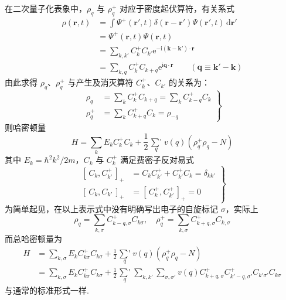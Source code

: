 在二次量子化表象中，$\rho_{q}$ 与 $\rho_{q}^{+}$ 对应于密度起伏算符，有关系式
\begin{equation}
\begin{aligned}
  \rho(\boldsymbol{r},t)
  &=\int\varPsi^{+}(\boldsymbol{r}',t)\delta(\boldsymbol{r}-\boldsymbol{r}')
  \varPsi(\boldsymbol{r}',t)\,\mathrm{d}\boldsymbol{r}'\\
  &=\varPsi^{+}(\boldsymbol{r},t)\varPsi(\boldsymbol{r},t)\\
  &=\sum_{k,k'}C_{k}^{+}C_{k'}\mathrm{e}^{-\mathrm{i}(\boldsymbol{k}-\boldsymbol{k}')\cdot\boldsymbol{r}}\\
  &=\sum_{k,q}C_{k}^{+}C_{k+q}\mathrm{e}^{\mathrm{i}\boldsymbol{q}\cdot\boldsymbol{r}}
  \qquad\left(\boldsymbol{q}\equiv\boldsymbol{k}'-\boldsymbol{k}\right)
\end{aligned}
\end{equation}
由此求得 $\rho_{q}$、$\rho_{q}^{+}$ 与产生及消灭算符 $C_{k}^{+}$、$C_{k'}$ 的关系为：
\begin{equation}
  \left.\begin{aligned}
  \rho_{q}&=\sum_{k}C_{k}^{+}C_{k+q}=\sum_{k}C_{k-q}^{+}C_{k}\\
  \rho_{q}^{+}&=\sum_{k}C_{k+q}^{+}C_{k}=\rho_{-q}
  \end{aligned}\right\}
\end{equation}
则哈密顿量
\begin{equation}
  H=\sum_{k}E_{k}C_{k}^{+}C_{k}
  +\frac{1}{2}\mathop{{\sum}'}\limits_{q}v(q)\left(\rho_{q}^{+}\rho_{q}-N\right)
\end{equation}
其中 $E_{k}=\hbar^{2}k^{2}/2m$，$C_{k}$ 与 $C_{k}^{+}$ 满足费密子反对易式
\begin{equation}
  \left.\begin{aligned}
  [\,C_{k},C_{k'}^{+}\,]_{+}&=C_{k}C_{k'}^{+}+C_{k'}^{+}C_{k}=\delta_{kk'}\\
  [\,C_{k},C_{k'}\,]_{+}&=[\,C_{k}^{+},C_{k'}^{+}\,]_{+}=0
  \end{aligned}\right\}
\end{equation}
为简单起见，在以上表示式中没有明确写出电子的自旋标记 $\sigma$，实际上
\begin{equation}
  \rho_{q}=\sum_{k,\sigma}C_{k-q,\sigma}^{+}C_{k\sigma},\quad
  \rho_{q}^{+}=\sum_{k,\sigma}C_{k+q,\sigma}^{+}C_{k,\sigma}
\end{equation}
而总哈密顿量为
\begin{equation}
\begin{aligned}
  H&=\sum_{k,\sigma}E_{k}C_{k\sigma}^{+}C_{k\sigma}
  +\frac{1}{2}\mathop{{\sum}'}\limits_{q}v(q)\left(\rho_{q}^{+}\rho_{q}-N\right)\\
  &=\sum_{k,\sigma}E_{k}C_{k\sigma}^{+}C_{k\sigma}
  +\frac{1}{2}\mathop{{\sum}'}\limits_{q}\sum_{k,k'}\sum_{\sigma,\sigma'}
  v(q)C_{k+q,\sigma}^{+}C_{k'-q,\sigma'}^{+}C_{k'\sigma'}C_{k\sigma}
\end{aligned}
\end{equation}
与通常的标准形式一样.

